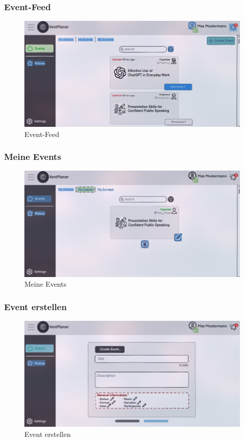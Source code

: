 \documentclass[a4paper,12pt]{article}
\begin{document}
\subsubsection{Event-Feed}
\begin{figure}[H]
    \centering
    \includegraphics[width=1\textwidth]{Abbildungen/events/event_feed.png}
    \caption{Event-Feed}
    \label{fig:event_Feed}
\end{figure}

\subsubsection{Meine Events}
\begin{figure}[H]
    \centering
    \includegraphics[width=1\textwidth]{Abbildungen/events/my_events.png}
    \caption{Meine Events}
    \label{fig:my_events}
\end{figure}

\subsubsection{Event erstellen}
\begin{figure}[H]
    \centering
    \includegraphics[width=1\textwidth]{Abbildungen/events/create_event.png}
    \caption{Event erstellen}
    \label{fig:create_event}
\end{figure}
\end{document}
